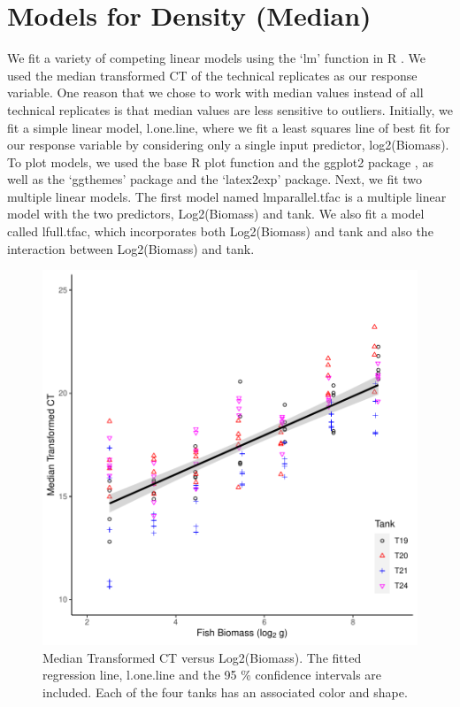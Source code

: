 \section{Models for Density (Median)}

We fit a variety of competing linear models using the `lm' function in R \citep{Rprogram}. We used the median transformed CT of the technical replicates as our response variable. One reason that we chose to work with median values instead of all technical replicates is that median values are less sensitive to outliers. Initially, we fit a simple linear model, l.one.line, where we fit a least squares line of best fit for our response variable by considering only a single input predictor, log2(Biomass). To plot models, we used the base R plot function and the ggplot2 package \citep{ggplot}, as well as the `ggthemes' package \citep{ggthemes} and the `latex2exp' package\citep{latextoexp}. Next, we fit two multiple linear models. The first model named lmparallel.tfac is a multiple linear model with the two predictors, Log2(Biomass) and tank. We also fit a model called lfull.tfac, which incorporates both Log2(Biomass) and tank and also the interaction between Log2(Biomass) and tank.


\begin{figure}[H]
\includegraphics{Chapter3Images/ggplotnew.pdf}
\caption{ Median Transformed CT versus Log2(Biomass). The fitted regression line, l.one.line and the 95 \% confidence intervals are included. Each of the four tanks has an associated color and shape.}
\label{fig:medct1}
\end{figure}



